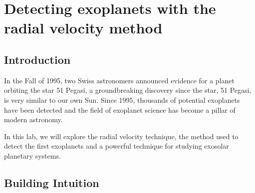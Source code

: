 \chapter{Detecting exoplanets with the radial velocity method}






\section{Introduction}

In the Fall of 1995, two Swiss astronomers announced evidence for a planet orbiting the star 51 Pegasi, a groundbreaking discovery since the star, 51 Pegasi, is very similar to our own Sun. Since 1995, thousands of potential exoplanets have been detected and the field of exoplanet science has become a pillar of modern astronomy.

In this lab, we will explore the radial velocity technique, the method used to detect the first exoplanets and a powerful technique for studying exosolar planetary systems.



\section{Building Intuition}

